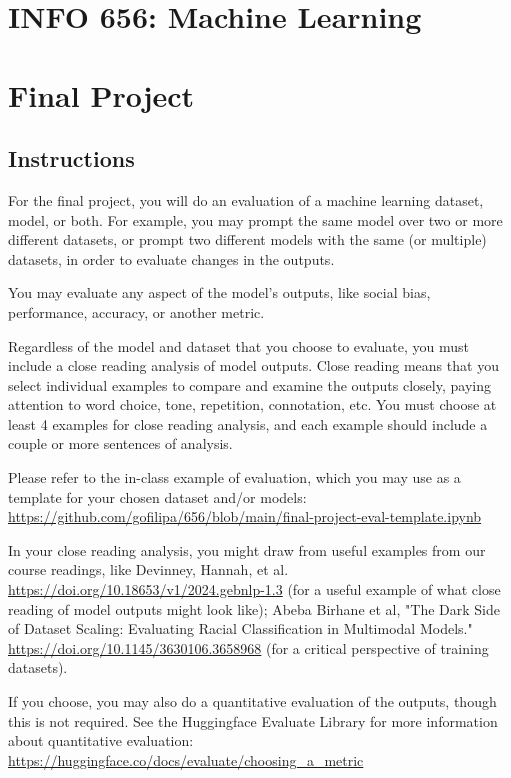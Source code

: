 \documentclass[12pt]{article}
\author{fcalado}
\date{\today}
\title{}
\begin{document}
\section*{INFO 656: Machine Learning}
\label{sec:org507f431}

\section*{Final Project}
\label{sec:org6d4bcaa}

\subsection*{Instructions}
\label{sec:org7f011cb}

For the final project, you will do an evaluation of a machine learning
dataset, model, or both. For example, you may prompt the same model
over two or more different datasets, or prompt two different models
with the same (or multiple) datasets, in order to evaluate changes in
the outputs.

You may evaluate any aspect of the model's outputs, like social bias,
performance, accuracy, or another metric.

Regardless of the model and dataset that you choose to evaluate, you
must include a close reading analysis of model outputs. Close reading
means that you select individual examples to compare and examine the
outputs closely, paying attention to word choice, tone, repetition,
connotation, etc. You must choose at least 4 examples for close
reading analysis, and each example should include a couple or more
sentences of analysis.

Please refer to the in-class example of evaluation, which you may use
as a template for your chosen dataset and/or models:
\url{https://github.com/gofilipa/656/blob/main/final-project-eval-template.ipynb}

In your close reading analysis, you might draw from useful examples
from our course readings, like Devinney, Hannah, et al.
\url{https://doi.org/10.18653/v1/2024.gebnlp-1.3} (for a useful example of
what close reading of model outputs might look like); Abeba Birhane et
al, "The Dark Side of Dataset Scaling: Evaluating Racial
Classification in Multimodal Models."
\url{https://doi.org/10.1145/3630106.3658968} (for a critical perspective of
training datasets).

If you choose, you may also do a quantitative evaluation of the
outputs, though this is not required. See the Huggingface Evaluate
Library for more information about quantitative evaluation:
\url{https://huggingface.co/docs/evaluate/choosing\_a\_metric}
\end{document}
